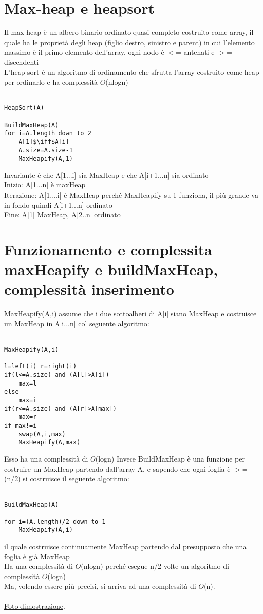 \documentclass[12pt,oneside,a4paper]{article}
\newcommand\Omicron{O}
\begin{document}
\section{Max-heap e heapsort}
Il max-heap è un albero binario ordinato quasi completo costruito come array, il quale ha le proprietà degli heap (figlio destro, sinistro e parent) in cui l'elemento massimo è il primo elemento dell'array, ogni nodo è $<$= antenati e $>$= discendenti\\
L'heap sort è un algoritmo di ordinamento che sfrutta l'array costruito come heap per ordinarlo e ha complessità $\Omicron$(nlogn)\\\\
\begin{lstlisting}[style=pseudocodice]
HeapSort(A)

BuildMaxHeap(A) 
for i=A.length down to 2
	A[1]$\iff$A[i]
	A.size=A.size-1
	MaxHeapify(A,1)
\end{lstlisting}
Invariante è che A[1...i] sia MaxHeap e che A[i+1...n] sia ordinato\\
Inizio: A[1...n] è maxHeap\\
Iterazione: A[1....i] è MaxHeap perché MaxHeapify su 1 funziona, il più grande va in fondo quindi A[i+1...n] ordinato\\
Fine: A[1] MaxHeap, A[2..n] ordinato
\section{Funzionamento e complessita maxHeapify e buildMaxHeap, complessità inserimento}
MaxHeapify(A,i) assume che i due sottoalberi di A[i] siano MaxHeap e costruisce un MaxHeap in A[i...n] col seguente algoritmo:\\\\
\begin{lstlisting}[style=pseudocodice]
MaxHeapify(A,i)

l=left(i) r=right(i)
if(l<=A.size) and (A[l]>A[i])
	max=l
else
	max=i
if(r<=A.size) and (A[r]>A[max])
	max=r
if max!=i
	swap(A,i,max)
	MaxHeapify(A,max)
\end{lstlisting}
Esso ha una complessità di $\Omicron$(logn)
Invece BuildMaxHeap è una funzione per costruire un MaxHeap partendo dall'array A, e sapendo che ogni foglia è $>$=(n/2) si costruisce il seguente algoritmo:\\\\
\begin{lstlisting}[style=pseudocodice]
BuildMaxHeap(A)

for i=(A.length)/2 down to 1
	MaxHeapify(A,i)
\end{lstlisting}
il quale costruisce continuamente MaxHeap partendo dal presupposto che una foglia è già MaxHeap\\
Ha una complessità di $\Omicron$(nlogn) perché esegue n/2 volte un algoritmo di complessità $\Omicron$(logn)\\
Ma, volendo essere più precisi, si arriva ad una complessità di $\Omicron$(n).\\\\
\href{complessitaBuild.pdf}{Foto dimostrazione}.
\end{document}
